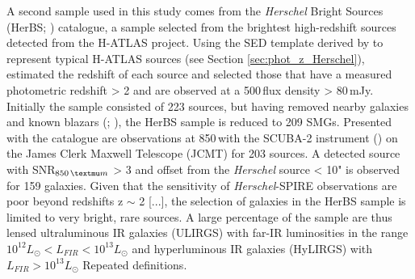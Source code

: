 A second sample used in this study comes from the \textit{Herschel} Bright Sources (HerBS; \citealt{Bakx_2018}) catalogue, a sample selected from the brightest high-redshift sources detected from the H-ATLAS project. Using the SED template derived by \citealt{Pearson_2013} to represent typical H-ATLAS sources (see Section \ref{sec:phot_z_Herschel}), \citealt{Bakx_2018} estimated the redshift of each source and selected those that have a measured photometric redshift > 2 and are observed at a 500\,\micron flux density > 80\,mJy. Initially the sample consisted of 223 sources, but having removed nearby galaxies and known blazars (\citealt{Negrello_2010}; \citealt{Lopez-Caniego_2013}), the HerBS sample is reduced to 209 SMGs. Presented with the catalogue are observations at 850\,\micron with the SCUBA-2 instrument (\citealt{Holland_2013}) on the James Clerk Maxwell Telescope (JCMT) for 203 sources. A detected source with SNR$_{850\,\micron}$ > 3 and offset from the \textit{Herschel} source < 10" is observed for 159 galaxies. Given that the sensitivity of \textit{Herschel}-SPIRE observations are poor beyond redshifts z $\sim$ 2 [...], the selection of galaxies in the HerBS sample is limited to very bright, rare sources. A large percentage of the sample are thus lensed ultraluminous IR galaxies (ULIRGS) with far-IR luminosities in the range $10^{12} L_\odot < L_{FIR} < 10^{13} L_\odot$ and hyperluminous IR galaxies (HyLIRGS) with $L_{FIR} > 10^{13} L_\odot$ {\color{red}Repeated definitions}.

